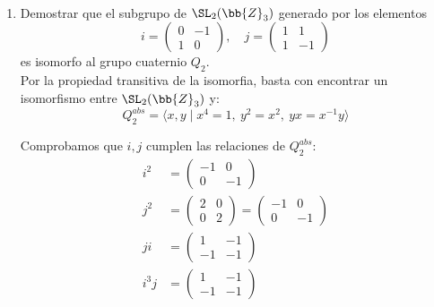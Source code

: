 \begin{ejercicio}\label{ej:3.3}~
    \begin{enumerate}
        \item Demostrar que el subgrupo de $\SL_2(\bb{Z}_3)$ generado por los elementos
        \[
            i = \begin{pmatrix}
                0 & -1 \\
                1 & 0
            \end{pmatrix}, \quad j = \begin{pmatrix}
                1 & 1 \\
                1 & -1
            \end{pmatrix}
        \]
        es isomorfo al grupo cuaternio $Q_2$.\\

        Por la propiedad transitiva de la isomorfia, basta con encontrar un isomorfismo entre $\SL_2(\bb{Z}_3)$ y:
        \begin{equation*}
            Q_2^{abs} = \langle x,y\mid x^4=1,\ y^2=x^2,\ yx=x^{-1}y\rangle
        \end{equation*}

        Comprobamos que $i,j$ cumplen las relaciones de $Q_2^{abs}$:
        \begin{align*}
            i^2 &= \begin{pmatrix}
                -1 & 0 \\
                0 & -1
            \end{pmatrix}\\
            j^2 &= \begin{pmatrix}
                2 & 0 \\
                0 & 2
            \end{pmatrix} = \begin{pmatrix}
                -1 & 0 \\
                0 & -1
            \end{pmatrix}\\
            ji &= \begin{pmatrix}
                1 & -1 \\
                -1 & -1
            \end{pmatrix}\\
            i^3j &= \begin{pmatrix}
                1 & -1 \\
                -1 & -1
            \end{pmatrix}
        \end{align*}


\end{enumerate}
\end{ejercicio}
